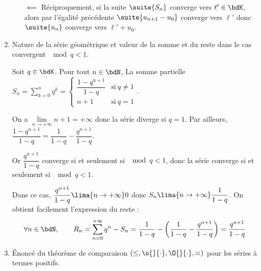 \documentclass[a4paper,french,bookmarks]{article}
\begin{document}
\begin{enumerate}
\begin{nproof}
\begin{enumerate}
            \itt $\boxed{\impliedby}$ Réciproquement, si la suite $\suite{S_n}$ converge vers $\ell' \in \bdK$, alors par l'égalité précédente $\suite{u_{n+1} - u_0}$ converge vers $\ell'$ donc $\suite{u_n}$ converge vers $\ell' + u_0$.
        \end{enumerate}
    \end{nproof}
    \yesbefore

    \item Nature de la série géométrique et valeur de la somme et du reste dans le cas convergent $\mod{q} < 1$.
    
    \noafter
    \nobefore\yesafter
    \begin{nproof}
        Soit $q \in \bdK$. Pour tout $n \in \bdN$, La somme partielle $S_n = \displaystyle\sum_{k=0}^n q^k = \left\lbrace\begin{array}{rc}
            \dfrac{1-q^{n+1}}{1-q} &\text{si} \ q \neq 1  \\
            n+1 &\text{si} \ q = 1 
        \end{array}\right.$.
        
        On a $\lim\limits_{n \to +\infty} n + 1 = + \infty$ donc la série diverge si $q = 1$. Par ailleurs, $\dfrac{1-q^{n+1}}{1-q} = \dfrac{1}{1-q} - \dfrac{q^{n+1}}{1-q}$.
        
        Or $\dfrac{q^{n+1}}{1-q}$ converge si et seulement si $\mod{q} < 1$, donc la série converge si et seulement si $\mod{q} < 1$.
        
        Dans ce cas, $\dfrac{q^{n+1}}{1-q} \lima{n \to +\infty} 0$ donc $S_n \lima{n \to +\infty} \dfrac{1}{1-q}$. On obtient facilement l'expression du reste :
        \[ \forall n \in \bdN,\qquad R_n = \sum_{n=0}^{+\infty} q^n - S_n = \dfrac{1}{1-q} - \left(\dfrac{1}{1-q} - \dfrac{q^{n+1}}{1-q}\right) = \dfrac{q^{n+1}}{1-q} \]
    \end{nproof}
    \yesbefore
    
    \item Énoncé du théorème de comparaison $(\leq , \o{}{\cdot}, \O{}{\cdot}, \asymp)$ pour les séries à termes positifs.
    

\end{enumerate}
\end{document}

